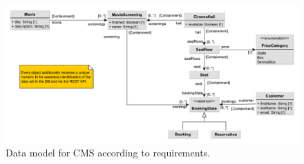 \begin{figure}[H]
    \centering
    \includegraphics[width=\textwidth]{images/data-model-final-enum}
    \caption{Data model for CMS according to requirements.}
    \label{fig:data-model-mps}
\end{figure}

